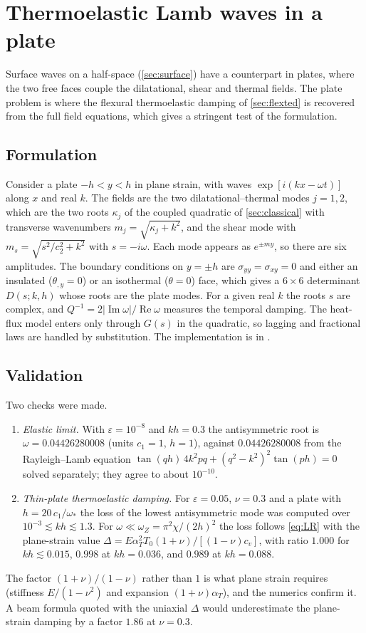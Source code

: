 \section{Thermoelastic Lamb waves in a plate}\label{sec:lamb}

Surface waves on a half-space (\cref{sec:surface}) have a counterpart in plates, where the two free faces couple the dilatational, shear and thermal fields. The plate problem is where the flexural thermoelastic damping of \cref{sec:flexted} is recovered from the full field equations, which gives a stringent test of the formulation.

\subsection{Formulation}
Consider a plate $-h<y<h$ in plane strain, with waves $\exp[i(kx-\omega t)]$ along $x$ and real $k$. The fields are the two dilatational--thermal modes $j=1,2$, which are the two roots $\kappa_j$ of the coupled quadratic of \cref{sec:classical} with transverse wavenumbers $m_j=\sqrt{\kappa_j+k^2}$, and the shear mode with $m_s=\sqrt{s^2/c_2^2+k^2}$ with $s=-i\omega$. Each mode appears as $e^{\pm m y}$, so there are six amplitudes. The boundary conditions on $y=\pm h$ are $\sigma_{yy}=\sigma_{xy}=0$ and either an insulated ($\theta_{,y}=0$) or an isothermal ($\theta=0$) face, which gives a $6\times6$ determinant $D(s;k,h)$ whose roots are the plate modes. For a given real $k$ the roots $s$ are complex, and $Q^{-1}=2|\operatorname{Im}\omega|/\operatorname{Re}\omega$ measures the temporal damping. The heat-flux model enters only through $G(s)$ in the quadratic, so lagging and fractional laws are handled by substitution. The implementation is in .

\subsection{Validation}
Two checks were made.
\begin{enumerate}
\item \emph{Elastic limit.} With $\varepsilon=10^{-8}$ and $kh=0.3$ the antisymmetric root is $\omega=0.04426280008$ (units $c_1=1$, $h=1$), against $0.04426280008$ from the Rayleigh--Lamb equation $\tan(qh)\,4k^2pq+(q^2-k^2)^2\tan(ph)=0$ solved separately; they agree to about $10^{-10}$.
\item \emph{Thin-plate thermoelastic damping.} For $\varepsilon=0.05$, $\nu=0.3$ and a plate with $h=20\,c_1/\omega_*$ the loss of the lowest antisymmetric mode was computed over $10^{-3}\lesssim kh\lesssim1.3$. For $\omega\ll\omega_Z=\pi^2\chi/(2h)^2$ the loss follows \cref{eq:LR} with the plane-strain value $\Delta=E\alpha_T^2T_0(1+\nu)/[(1-\nu)c_v]$, with ratio $1.000$ for $kh\lesssim0.015$, $0.998$ at $kh=0.036$, and $0.989$ at $kh=0.088$.
\end{enumerate}
The factor $(1+\nu)/(1-\nu)$ rather than $1$ is what plane strain requires (stiffness $E/(1-\nu^2)$ and expansion $(1+\nu)\alpha_T$), and the numerics confirm it. A beam formula quoted with the uniaxial $\Delta$ would underestimate the plane-strain damping by a factor $1.86$ at $\nu=0.3$.

